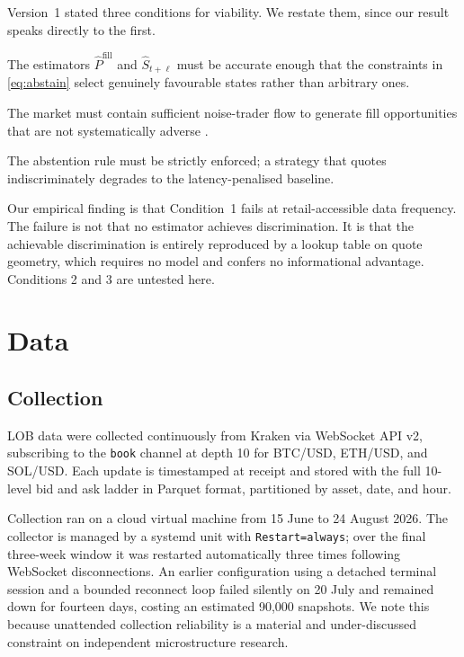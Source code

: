 \documentclass[11pt]{article}
\begin{document}
Version~1 stated three conditions for viability. We restate them, since our
result speaks directly to the first.

\begin{description}[itemsep=3pt,topsep=4pt]
\item[Condition 1 --- Predictive accuracy.] The estimators
$\widehat{P}^{\text{fill}}$ and $\widehat{S}_{t+\ell}$ must be accurate enough
that the constraints in \eqref{eq:abstain} select genuinely favourable states
rather than arbitrary ones.

\item[Condition 2 --- Uninformed order flow.] The market must contain
sufficient noise-trader flow to generate fill opportunities that are not
systematically adverse \citep{chen2018}.

\item[Condition 3 --- Abstention discipline.] The abstention rule must be
strictly enforced; a strategy that quotes indiscriminately degrades to the
latency-penalised baseline.
\end{description}

\noindent
Our empirical finding is that Condition~1 fails at retail-accessible data
frequency. The failure is not that no estimator achieves discrimination. It is
that the achievable discrimination is entirely reproduced by a lookup table on
quote geometry, which requires no model and confers no informational
advantage.
Conditions 2 and 3 are untested here.

\section{Data}
\label{sec:data}

\subsection{Collection}

LOB data were collected continuously from Kraken via WebSocket API v2,
subscribing to the \texttt{book} channel at depth 10 for BTC/USD, ETH/USD, and
SOL/USD. Each update is timestamped at receipt and stored with the full 10-level
bid and ask ladder in Parquet format, partitioned by asset, date, and hour.

Collection ran on a cloud virtual machine from 15 June to 24 August 2026. The
collector is managed by a systemd unit with \texttt{Restart=always}; over the
final three-week window it was restarted automatically three times following
WebSocket disconnections. An earlier configuration using a detached terminal
session and a bounded reconnect loop failed silently on 20 July and remained
down for fourteen days, costing an estimated 90{,}000 snapshots. We note this
because unattended collection reliability is a material and under-discussed
constraint on independent microstructure research.
\end{document}

